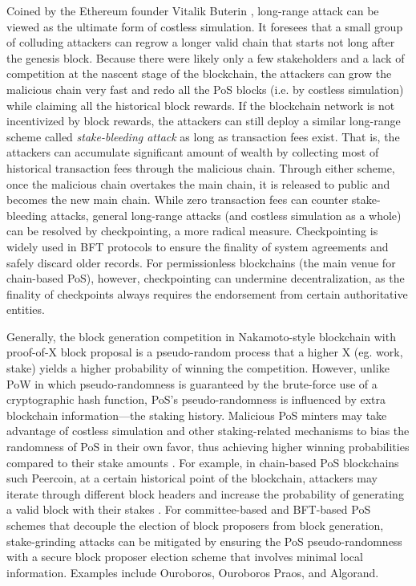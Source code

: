 Coined by the Ethereum founder Vitalik Buterin , long-range attack can be viewed as the ultimate form of costless simulation. It foresees that a small group of colluding attackers can regrow a longer valid chain that starts not long after the genesis block. Because there were likely only a few stakeholders and a lack of competition at the nascent stage of the blockchain, the attackers can grow the malicious chain very fast and redo all the PoS blocks (i.e. by costless simulation) while claiming all the historical block rewards. If the blockchain network is not incentivized by block rewards, the attackers can still deploy a similar long-range scheme called \textit{stake-bleeding attack}  as long as transaction fees exist. That is, the attackers can accumulate significant amount of wealth by collecting most of historical transaction fees through the malicious chain. Through either scheme, once the malicious chain overtakes the main chain, it is released to public and becomes the new main chain. 
While zero transaction fees can counter stake-bleeding attacks, general long-range attacks (and costless simulation as a whole) can be resolved by checkpointing, a more radical measure. Checkpointing is widely used in BFT protocols to ensure the finality of system agreements and safely discard older records. For permissionless blockchains (the main venue for chain-based PoS), however, checkpointing can undermine decentralization, as the finality of checkpoints always requires the endorsement from certain authoritative entities.

Generally, the block generation competition in Nakamoto-style blockchain with proof-of-X block proposal is a pseudo-random process that a higher X (eg. work, stake) yields a higher probability of winning the competition. 
However, unlike PoW in which pseudo-randomness is guaranteed by the brute-force use of a cryptographic hash function, PoS's pseudo-randomness is influenced by extra blockchain information---the staking history. Malicious PoS minters may take advantage of costless simulation and other staking-related mechanisms to bias the randomness of PoS in their own favor, thus achieving higher winning probabilities compared to their stake amounts . For example, in chain-based PoS blockchains such Peercoin, at a certain historical point of the blockchain, attackers may iterate through different block headers and increase the probability of generating a valid block with their stakes .
For committee-based and BFT-based PoS schemes that decouple the election of block proposers from block generation, stake-grinding attacks can be mitigated by ensuring the PoS pseudo-randomness with a secure block proposer election scheme that involves minimal local information. Examples include Ouroboros, Ouroboros Praos, and Algorand.

